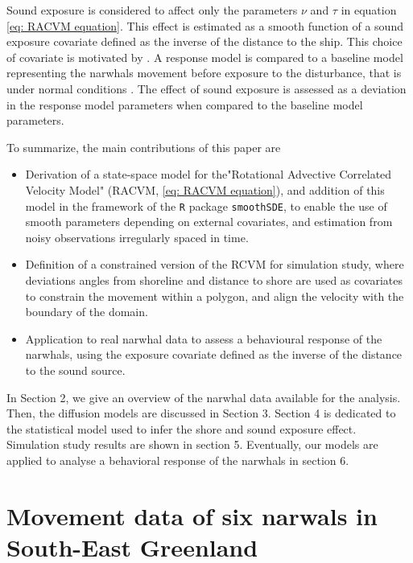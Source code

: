 \documentclass[11pt]{article}
\newcommand {\1}{\mathbb{1}}
\begin{document}
Sound exposure is considered to affect only the parameters $\nu$ and $\tau$ in equation \ref{eq: RACVM equation}. This effect is estimated as a smooth function of a sound exposure covariate defined as the inverse of the distance to the ship. This choice of covariate is motivated by \cite{heide-jorgensen_behavioral_2021}. A response model is compared to a baseline model representing the narwhals movement before exposure to the disturbance, that is under normal conditions \cite{michelot_continuous-time_2022}.
The effect of sound exposure is assessed as a deviation in the response model parameters when compared to the baseline model parameters.



To summarize, the main contributions of this paper are
\begin{itemize}
	\item Derivation of a state-space model for the"Rotational Advective Correlated Velocity Model" (RACVM, \ref{eq: RACVM equation}), and addition of this model in the framework of  the \texttt{R} package \texttt{smoothSDE}, to enable the use of smooth parameters depending on external covariates, and estimation from noisy observations irregularly spaced in time.
	\item Definition of a constrained version of the RCVM for simulation study, where deviations angles from shoreline and distance to shore are used as covariates to constrain the movement within a polygon, and align the velocity with the boundary of the domain.
	\item Application to real narwhal data to assess a behavioural response of the narwhals, using the exposure covariate defined as the inverse of the distance to the sound source.
\end{itemize}

In Section 2, we give an overview of the narwhal data available for the analysis.
Then, the diffusion models are discussed in Section 3. Section 4 is dedicated to the statistical model used to infer the shore and sound exposure effect. Simulation study results are shown in section 5. Eventually, our models are applied to analyse a behavioral response of the narwhals in section 6.





\section{Movement data of six narwals in South-East Greenland}
\end{document}
